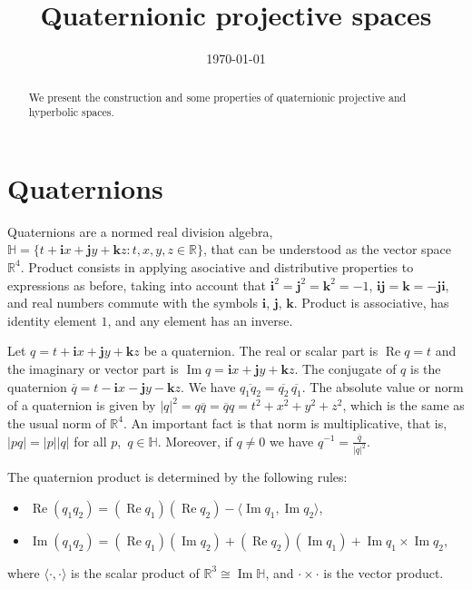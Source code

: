 \documentclass[12pt, a4paper]{amsart}
\newcommand{\R}{\mathbb{R}}
\renewcommand{\H}{\mathbb{H}}
\renewcommand{\Re}{\operatorname{Re}}
\renewcommand{\Im}{\operatorname{Im}}
\theoremstyle{remark}
\begin{document}
\title{Quaternionic projective spaces}

\begin{abstract}
We present the construction and some properties of quaternionic projective and hyperbolic spaces.
\end{abstract}

\date{\today}
\maketitle

\section{Quaternions}

Quaternions are a normed real division algebra,  
{$\H=\{t+\mathbf{i}x+\mathbf{j}y+\mathbf{k}z:t,x,y,z\in\R\}$}, that can be understood as the vector space $\R^4$. 
Product consists in applying asociative and distributive properties to expressions as before, 
taking into account that $\mathbf{i}^2=\mathbf{j}^2=\mathbf{k}^2=-1$, $\mathbf{i}\mathbf{j}=\mathbf{k}=-\mathbf{j}\mathbf{i}$, and real numbers commute with the symbols 
$\mathbf{i}$, $\mathbf{j}$, $\mathbf{k}$. 
Product is associative, has identity element $1$, and any element has an inverse.

Let $q=t+\mathbf{i}x+\mathbf{j}y+\mathbf{k}z$ be a quaternion. 
The real or scalar part is $\Re{q}=t$ and the imaginary or vector part is 
$\Im{q}=\mathbf{i}x+\mathbf{j}y+\mathbf{k}z$. 
The {conjugate} of $q$ is the quaternion $\overline{q}=t-\mathbf{i}x-\mathbf{j}y-\mathbf{k}z$. 
We have $\overline{q_1 q_2}=\overline{q_2}\,\overline{q_1}$. 
The absolute value or norm of a quaternion is given by
$\lvert q\rvert^2=q\overline{q}=\overline{q}q=t^2+x^2+y^2+z^2$, 
which is the same as the usual norm of $\R^4$. 
An important fact is that norm is multiplicative, that is,
$\lvert pq\rvert=\lvert p\rvert\lvert q\rvert$ for all $p$,~$q\in\H$. 
Moreover, if $q\neq 0$ we have $q^{-1}=\frac{\overline{q}}{\lvert q\rvert^2}$.

The quaternion product is determined by the following rules:
\begin{itemize}
\item $\Re{(q_1 q_2)}=(\Re{q_1})(\Re{q_2})-\langle \Im{q_1},\Im{q_2}\rangle$,
\item $\Im{(q_1 q_2)}=(\Re{q_1})(\Im{q_2})+(\Re{q_2})(\Im{q_1})+\Im{q_1}\times\Im{q_2}$,
\end{itemize}
where $\langle\cdot,\cdot\rangle$ is the scalar product of $\R^3\cong\Im\H$, 
and $\cdot\times\cdot$ is the vector product. 
\end{document}
